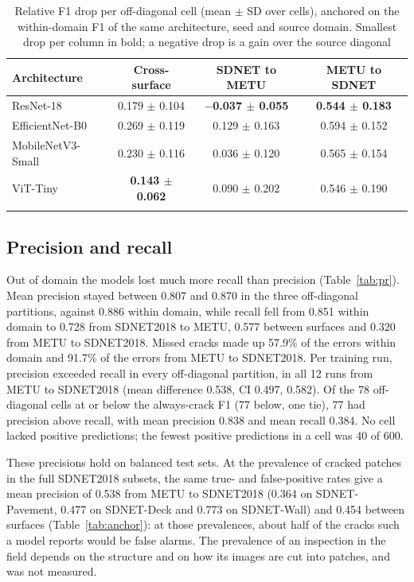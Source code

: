 \documentclass[pdflatex,sn-apa]{sn-jnl}
\begin{document}
\begin{table}[t]
\caption{Relative F1 drop per off-diagonal cell (mean $\pm$ SD over cells), anchored on the within-domain F1 of the same architecture, seed and source domain. Smallest drop per column in bold; a negative drop is a gain over the source diagonal}\label{tab:drop}
\begin{tabular*}{\textwidth}{@{\extracolsep\fill}lccc@{}}
\toprule
Architecture & Cross-surface & SDNET to METU & METU to SDNET \\
\midrule
ResNet-18 & 0.179 $\pm$ 0.104 & \textbf{$-$0.037 $\pm$ 0.055} & \textbf{0.544 $\pm$ 0.183} \\
EfficientNet-B0 & 0.269 $\pm$ 0.119 & 0.129 $\pm$ 0.163 & 0.594 $\pm$ 0.152 \\
MobileNetV3-Small & 0.230 $\pm$ 0.116 & 0.036 $\pm$ 0.120 & 0.565 $\pm$ 0.154 \\
ViT-Tiny & \textbf{0.143 $\pm$ 0.062} & 0.090 $\pm$ 0.202 & 0.546 $\pm$ 0.190 \\
\botrule
\end{tabular*}
\end{table}

\subsection{Precision and recall}\label{sec:res-pr}

Out of domain the models lost much more recall than precision (Table~\ref{tab:pr}). Mean precision stayed between 0.807 and 0.870 in the three off-diagonal partitions, against 0.886 within domain, while recall fell from 0.851 within domain to 0.728 from SDNET2018 to METU, 0.577 between surfaces and 0.320 from METU to SDNET2018. Missed cracks made up 57.9\% of the errors within domain and 91.7\% of the errors from METU to SDNET2018. Per training run, precision exceeded recall in every off-diagonal partition, in all 12 runs from METU to SDNET2018 (mean difference 0.538, CI 0.497, 0.582). Of the 78 off-diagonal cells at or below the always-crack F1 (77 below, one tie), 77 had precision above recall, with mean precision 0.838 and mean recall 0.384. No cell lacked positive predictions; the fewest positive predictions in a cell was 40 of 600.

These precisions hold on balanced test sets. At the prevalence of cracked patches in the full SDNET2018 subsets, the same true- and false-positive rates give a mean precision of 0.538 from METU to SDNET2018 (0.364 on SDNET-Pavement, 0.477 on SDNET-Deck and 0.773 on SDNET-Wall) and 0.454 between surfaces (Table~\ref{tab:anchor}): at those prevalences, about half of the cracks such a model reports would be false alarms. The prevalence of an inspection in the field depends on the structure and on how its images are cut into patches, and was not measured.
\end{document}
